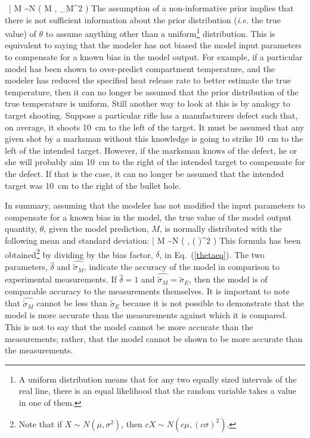 \be
   \delta \, \theta \; | \; M \sim N \left( M \; , \; \sigma_M^2 \right) \label{thetaeq}
\ee
The assumption of a non-informative prior implies that there is not sufficient information about the
prior distribution ({\em i.e.} the true value) of
$\theta$ to assume anything other than a uniform\footnote{A uniform distribution means that for any two equally sized intervals of the real line,
there is an equal likelihood that the random variable takes a value in one of them.} distribution.
This is equivalent to saying that the modeler has not biased the model input parameters to compensate for a known
bias in the model output. For example, if a particular model has been shown to over-predict compartment temperature, and the modeler has reduced the specified heat release
rate to better estimate the true temperature, then it can no longer be assumed that the prior distribution of the true temperature is uniform.
Still another way to look at this is by analogy to target shooting. Suppose a particular rifle
has a manufacturers defect such that, on average, it shoots 10~cm to the left of the target. It must be assumed that any given shot by a marksman without this knowledge is
going to strike 10~cm to the left of the intended target. However, if the marksman knows of the defect, he or she will probably aim 10~cm to the right of the
intended target to compensate for the defect. If that is the case, it can no longer be assumed that the intended target was 10~cm to the right of the bullet hole.

In summary, assuming that the modeler has not modified the input parameters to compensate for a known bias in the model,
the true value of the model output quantity, $\theta$, given the model prediction, $M$, is normally distributed with the following mean and standard deviation:
\be
   \theta \; | \; M \sim N \left(  \; , \;  \left(  \right)^2 \right) \label{truth}
\ee
This formula has been obtained\footnote{Note that if $X \sim N(\mu,\sigma^2)$, then
$cX \sim N ( c \mu , (c \sigma)^2)$.} by dividing by the bias factor, $\delta$, in Eq.~(\ref{thetaeq}). The two parameters, $\hat{\delta}$ and $\widehat{\widetilde{\sigma}_M}$,
indicate the accuracy of the model in comparison to experimental measurements. If $\hat{\delta}=1$ and $\widehat{\widetilde{\sigma}_M}=\widetilde{\sigma}_E$, then the
model is of comparable accuracy to the measurements themselves. It is important to note that $\widehat{\widetilde{\sigma}_M}$ cannot be less than
$\widetilde{\sigma}_E$ because it is not possible to demonstrate that the model is more accurate than the measurements against which it is compared. This is not to say that the model
cannot be more accurate than the measurements; rather, that the model cannot be shown to be more accurate than the measurements.



